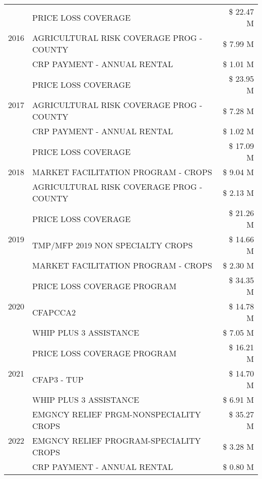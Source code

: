 \begin{tabular}{llr}
\cline{1-3}
\multirow[t]{3}{*}{2016} & PRICE LOSS COVERAGE & \$ 22.47 M \\
 & AGRICULTURAL RISK COVERAGE PROG - COUNTY & \$ 7.99 M \\
 & CRP PAYMENT - ANNUAL RENTAL & \$ 1.01 M \\
\cline{1-3}
\multirow[t]{3}{*}{2017} & PRICE LOSS COVERAGE & \$ 23.95 M \\
 & AGRICULTURAL RISK COVERAGE PROG - COUNTY & \$ 7.28 M \\
 & CRP PAYMENT - ANNUAL RENTAL & \$ 1.02 M \\
\cline{1-3}
\multirow[t]{3}{*}{2018} & PRICE LOSS COVERAGE & \$ 17.09 M \\
 & MARKET FACILITATION PROGRAM - CROPS & \$ 9.04 M \\
 & AGRICULTURAL RISK COVERAGE PROG - COUNTY & \$ 2.13 M \\
\cline{1-3}
\multirow[t]{3}{*}{2019} & PRICE LOSS COVERAGE & \$ 21.26 M \\
 & TMP/MFP 2019 NON SPECIALTY CROPS & \$ 14.66 M \\
 & MARKET FACILITATION PROGRAM - CROPS & \$ 2.30 M \\
\cline{1-3}
\multirow[t]{3}{*}{2020} & PRICE LOSS COVERAGE PROGRAM & \$ 34.35 M \\
 & CFAPCCA2 & \$ 14.78 M \\
 & WHIP PLUS 3 ASSISTANCE & \$ 7.05 M \\
\cline{1-3}
\multirow[t]{3}{*}{2021} & PRICE LOSS COVERAGE PROGRAM & \$ 16.21 M \\
 & CFAP3 - TUP & \$ 14.70 M \\
 & WHIP PLUS 3 ASSISTANCE & \$ 6.91 M \\
\cline{1-3}
\multirow[t]{3}{*}{2022} & EMGNCY RELIEF PRGM-NONSPECIALITY CROPS & \$ 35.27 M \\
 & EMGNCY RELIEF PROGRAM-SPECIALITY CROPS & \$ 3.28 M \\
 & CRP PAYMENT - ANNUAL RENTAL & \$ 0.80 M \\
\cline{1-3}
\bottomrule
\end{tabular}
